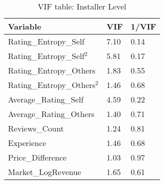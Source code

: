 \begin{table}[]
\centering
\begin{tabular}{@{}lll@{}}
\toprule
Variable                           & VIF  & 1/VIF \\ \midrule
Rating\_Entropy\_Self                & 7.10 & 0.14  \\
Rating\_Entropy\_Self$^2$            & 5.81 & 0.17  \\
Rating\_Entropy\_Others              & 1.83 & 0.55  \\
Rating\_Entropy\_Others$^2$          & 1.46 & 0.68  \\
Average\_Rating\_Self                & 4.59 & 0.22  \\
Average\_Rating\_Others             & 1.40 & 0.71  \\
Reviews\_Count                      & 1.24 & 0.81  \\
Experience                         & 1.46 & 0.68  \\
Price\_Difference                  & 1.03 & 0.97  \\
Market\_LogRevenue                 & 1.65 & 0.61  \\ \bottomrule
\end{tabular}
\caption{VIF table: Installer Level}
\label{vif_ind}
\end{table}